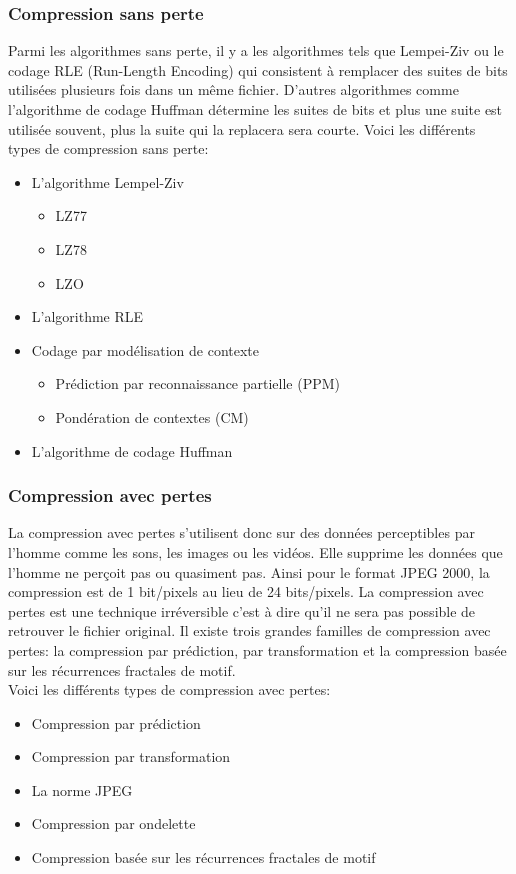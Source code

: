 \documentclass[a4paper,11pt]{report}
\begin{document}
	\subsubsection{Compression sans perte}
		Parmi les algorithmes sans perte, il y a les algorithmes tels que Lempei-Ziv ou le codage RLE (Run-Length Encoding) qui consistent à remplacer des suites de bits utilisées plusieurs fois dans un même fichier. D'autres algorithmes comme l'algorithme de codage Huffman détermine les suites de bits et plus une suite est utilisée souvent, plus la suite qui la replacera sera courte. 
Voici les différents types de compression sans perte:
		\begin{itemize}
			\item L'algorithme Lempel-Ziv
			\begin{itemize}
				\item LZ77	
				\item LZ78
				\item LZO
			\end{itemize}
			\item L'algorithme RLE
			\item Codage par modélisation de contexte
			\begin{itemize}
				\item Prédiction par reconnaissance partielle (PPM)
				\item Pondération de contextes (CM)
			\end{itemize}
			\item L'algorithme de codage Huffman
		\end{itemize}
	\subsubsection{Compression avec pertes}
		La compression avec pertes s'utilisent donc sur des données perceptibles par l'homme comme les sons, les images ou les vidéos. Elle supprime les données que l'homme ne perçoit pas ou quasiment pas. Ainsi pour le format JPEG 2000, la compression est de 1 bit/pixels au lieu de 24 bits/pixels. La compression avec pertes est une technique irréversible c'est à dire qu'il ne sera pas possible de retrouver le fichier original. Il existe trois grandes familles de compression avec pertes: la compression par prédiction, par transformation et la compression basée sur les récurrences fractales de motif.\\
 Voici les différents types de compression avec pertes:
		\begin{itemize}
			\item Compression par prédiction
			\item Compression par transformation
			\item La norme JPEG
			\item Compression par ondelette
			\item Compression basée sur les récurrences fractales de motif
		\end{itemize}
\end{document}
